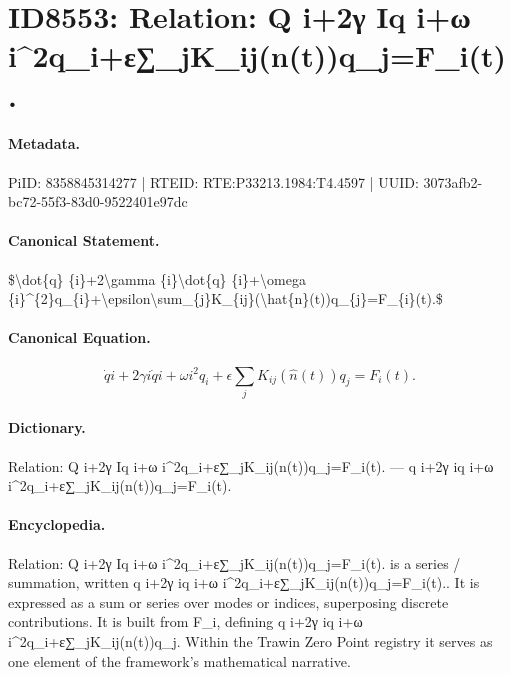 \section*{ID8553: Relation: Q i+2γ Iq i+ω i\textasciicircum{}2q\_i+ε∑\_jK\_ij(n(t))q\_j=F\_i(t).}
\paragraph{Metadata.}
PiID: 8358845314277 | RTEID: RTE:P33213.1984:T4.4597 | UUID: 3073afb2-bc72-55f3-83d0-9522401e97dc

\paragraph{Canonical Statement.}
\$\textbackslash{}dot\{q\} \{i\}+2\textbackslash{}gamma \{i\}\textbackslash{}dot\{q\} \{i\}+\textbackslash{}omega \{i\}\textasciicircum{}\{2\}q\_\{i\}+\textbackslash{}epsilon\textbackslash{}sum\_\{j\}K\_\{ij\}(\textbackslash{}hat\{n\}(t))q\_\{j\}=F\_\{i\}(t).\$

\paragraph{Canonical Equation.}
\[
\dot{q} {i}+2\gamma {i}\dot{q} {i}+\omega {i}^{2}q_{i}+\epsilon\sum_{j}K_{ij}(\hat{n}(t))q_{j}=F_{i}(t).
\]

\paragraph{Dictionary.}
Relation: Q i+2γ Iq i+ω i\textasciicircum{}2q\_i+ε∑\_jK\_ij(n(t))q\_j=F\_i(t). — q i+2γ iq i+ω i\textasciicircum{}2q\_i+ε∑\_jK\_ij(n(t))q\_j=F\_i(t).

\paragraph{Encyclopedia.}
Relation: Q i+2γ Iq i+ω i\textasciicircum{}2q\_i+ε∑\_jK\_ij(n(t))q\_j=F\_i(t). is a series / summation, written q i+2γ iq i+ω i\textasciicircum{}2q\_i+ε∑\_jK\_ij(n(t))q\_j=F\_i(t).. It is expressed as a sum or series over modes or indices, superposing discrete contributions. It is built from F\_i, defining q i+2γ iq i+ω i\textasciicircum{}2q\_i+ε∑\_jK\_ij(n(t))q\_j. Within the Trawin Zero Point registry it serves as one element of the framework's mathematical narrative.
